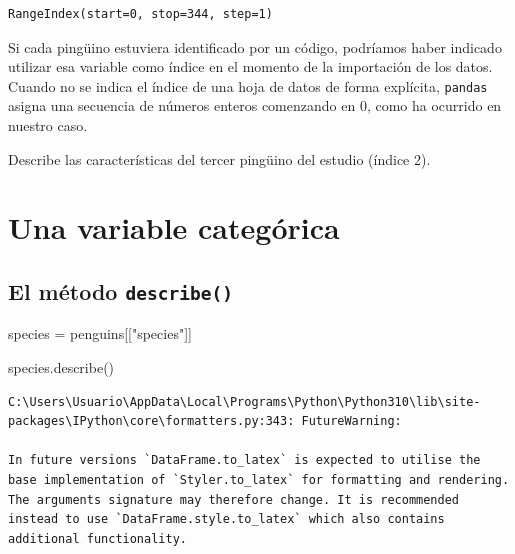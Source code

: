 \documentclass[
  a4paper,
  noprof,
  12pt,
  notoc,
  nosols,
  nobib]{mnye}
\newenvironment{Shaded}{\begin{snugshade}}{\end{snugshade}}
\newcommand{\NormalTok}[1]{\textcolor[rgb]{0.00,0.23,0.31}{#1}}
\newcommand{\OperatorTok}[1]{\textcolor[rgb]{0.37,0.37,0.37}{#1}}
\newcommand{\StringTok}[1]{\textcolor[rgb]{0.13,0.47,0.30}{#1}}
\renewenvironment{exercise}[1][]{
            \if\relax\detokenize{#1}\relax
                \ex
            \else
                \ex[note={#1}]
            \fi
        }{\endex}
\theoremstyle{definition}
\newtheorem{exercise}{Ejercicio}[section]
\theoremstyle{remark}
\begin{document}
\begin{verbatim}
RangeIndex(start=0, stop=344, step=1)
\end{verbatim}

Si cada pingüino estuviera identificado por un código, podríamos haber
indicado utilizar esa variable como índice en el momento de la
importación de los datos. Cuando no se indica el índice de una hoja de
datos de forma explícita, \texttt{pandas} asigna una secuencia de
números enteros comenzando en 0, como ha ocurrido en nuestro caso.

\begin{exercise}[]%
\protect\hypertarget{exr-data}{}\label{exr-data}%
Describe las características del tercer pingüino del estudio (índice 2).

\end{exercise}


\hypertarget{una-variable-categuxf3rica}{%
\section{Una variable categórica}\label{una-variable-categuxf3rica}}

\hypertarget{el-muxe9todo-describe}{%
\subsection{\texorpdfstring{El método
\texttt{describe()}}{El método describe()}}\label{el-muxe9todo-describe}}

\begin{Shaded}
\begin{Highlighting}[]
\NormalTok{species }\OperatorTok{=}\NormalTok{ penguins[[}\StringTok{"species"}\NormalTok{]]}
\end{Highlighting}
\end{Shaded}

\begin{Shaded}
\begin{Highlighting}[]
\NormalTok{species.describe()}
\end{Highlighting}
\end{Shaded}

\begin{verbatim}
C:\Users\Usuario\AppData\Local\Programs\Python\Python310\lib\site-packages\IPython\core\formatters.py:343: FutureWarning:

In future versions `DataFrame.to_latex` is expected to utilise the base implementation of `Styler.to_latex` for formatting and rendering. The arguments signature may therefore change. It is recommended instead to use `DataFrame.style.to_latex` which also contains additional functionality.
\end{verbatim}
\end{document}
